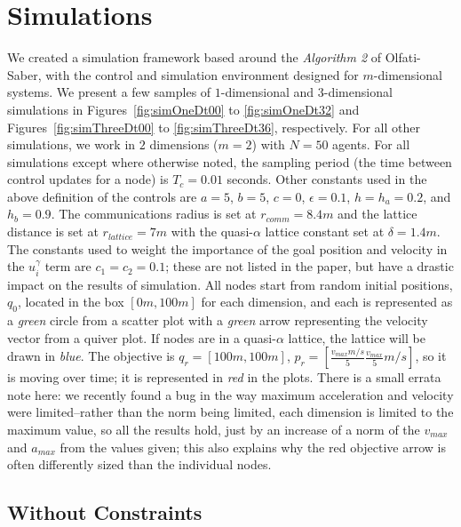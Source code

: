 \documentclass[10pt, conference]{IEEEtran}
\begin{document}
\section{Simulations}
\label{sec:simulations}

We created a simulation framework based around the \textit{Algorithm 2} of Olfati-Saber, with the control and simulation environment designed for $m$-dimensional systems.
%
We present a few samples of $1$-dimensional and $3$-dimensional simulations in Figures~\ref{fig:simOneDt00} to \ref{fig:simOneDt32} and Figures~\ref{fig:simThreeDt00} to \ref{fig:simThreeDt36}, respectively.
%
For all other simulations, we work in $2$ dimensions ($m=2$) with $N=50$ agents.
%
For all simulations except where otherwise noted, the sampling period (the time between control updates for a node) is $T_c = 0.01$ seconds.
%
Other constants used in the above definition of the controls are $a=5$, $b=5$, $c=0$, $\epsilon=0.1$, $h=h_a = 0.2$, and $h_b = 0.9$.
%
The communications radius is set at $r_{comm}=8.4m$ and the lattice distance is set at $r_{lattice}=7m$ with the quasi-$\alpha$ lattice constant set at $\delta=1.4m$.
%
The constants used to weight the importance of the goal position and velocity in the $u_i^{\gamma}$ term are $c_1=c_2=0.1$; these are not listed in the \cite{os2006} paper, but have a drastic impact on the results of simulation.
%
All nodes start from random initial positions, $q_0$, located in the box $[0m, 100m]$ for each dimension, and each is represented as a \textit{green} circle from a scatter plot with a \textit{green} arrow representing the velocity vector from a quiver plot.
%
If nodes are in a quasi-$\alpha$ lattice, the lattice will be drawn in \textit{blue}.
%
The objective is $q_r=[100m, 100m]$, $p_r=[\frac{v_{max}m/s}{5} \frac{v_{max}}{5}m/s]$, so it is moving over time; it is represented in \textit{red} in the plots.
%
There is a small errata note here: we recently found a bug in the way maximum acceleration and velocity were limited--rather than the norm being limited, each dimension is limited to the maximum value, so all the results hold, just by an increase of a norm of the $v_{max}$ and $a_{max}$ from the values given; this also explains why the red objective arrow is often differently sized than the individual nodes.

\subsection{Without Constraints}
\end{document}
